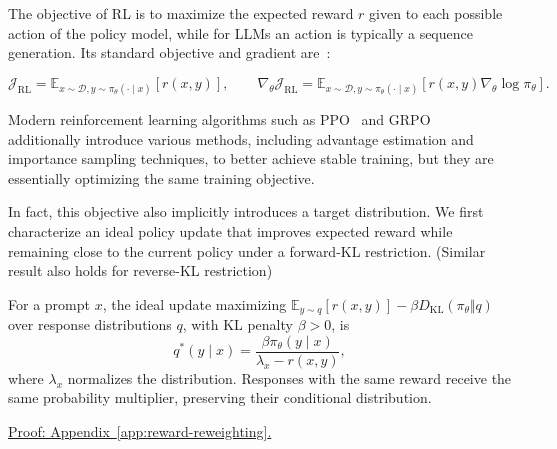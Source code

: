 
The objective of RL is to maximize the expected reward $r$ given to each possible action of the policy model, while for LLMs an action is typically a sequence generation. Its standard objective and gradient are~\citep{williams_simple_1992}:

\begin{equation}
  \mathcal{J}_{\mathrm{RL}} = \mathbb{E}_{x\sim\mathcal{D}, y\sim\pi_\theta (\cdot\mid x)} [r(x, y)],\qquad \nabla_\theta \mathcal{J}_{\mathrm{RL}} = \mathbb{E}_{x\sim\mathcal{D}, y\sim\pi_\theta (\cdot\mid x)} [r(x, y) \nabla_\theta \log \pi_\theta].
  \label{eq:std-rfalgo}
\end{equation}

Modern reinforcement learning algorithms such as PPO~\citep{schulman_proximal_2017} and GRPO~\citep{shao_deepseekmath_2024} additionally introduce various methods, including advantage estimation and importance sampling techniques, to better achieve stable training, but they are essentially optimizing the same training objective.


In fact, this objective also implicitly introduces a target distribution. We first characterize an ideal policy update that improves expected reward
while remaining close to the current policy under a forward-KL restriction. (Similar result also holds for reverse-KL restriction)

\begin{theorem}
\label{lem:reward-reweighting}
For a prompt $x$, the ideal update maximizing
$\mathbb E_{y\sim q}[r(x,y)]-\beta D_{\mathrm{KL}}(\pi_\theta\Vert q)$
over response distributions $q$, with KL penalty $\beta>0$, is
\begin{equation}
 q^*(y\mid x)
 =\frac{\beta\pi_\theta(y\mid x)}{\lambda_x-r(x,y)},
 \label{eq:reward-reciprocal-tilt}
\end{equation}
where $\lambda_x$ normalizes the distribution. Responses with the same
reward receive the same probability multiplier, preserving their
conditional distribution.
\end{theorem}
\noindent\hyperref[app:reward-reweighting]{Proof: Appendix~\ref*{app:reward-reweighting}.}

